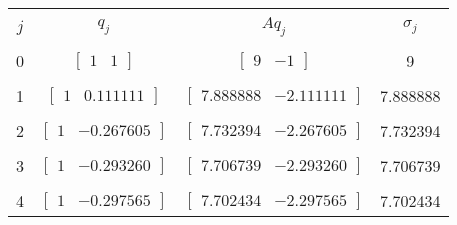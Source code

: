 \documentclass[a4paper,11pt]{article}
\begin{document}
\begin{enumerate}[label=\textbf{(\alph*)}]
            \begin{center}
                \begin{tabular}{ | c | c | c | c | } 
                    \hline
                    & & & \\ [-1em]
                    $j$ & $q_j$ & $Aq_j$ & $\sigma_j$\\  [+.5em]
                    \hline\hline
                    & & & \\ [-1em]
                    0 & $\begin{bmatrix} 1 & 1 \end{bmatrix}$ & $\begin{bmatrix} 9 & -1 \end{bmatrix}$  & 9\\ [+.5em]
                    \hline
                    & & & \\ [-1em]
                    1 & $\begin{bmatrix} 1 & 0.111111 \end{bmatrix}$ & $\begin{bmatrix} 7.888888 & -2.111111 \end{bmatrix}$  & 7.888888\\ [+.5em]
                    \hline
                    & & & \\ [-1em]
                    2 & $\begin{bmatrix} 1 & -0.267605 \end{bmatrix}$ & $\begin{bmatrix} 7.732394 & -2.267605 \end{bmatrix}$  & 7.732394\\ [+.5em]
                    \hline
                    & & & \\ [-1em]
                    3 & $\begin{bmatrix} 1 & -0.293260 \end{bmatrix}$ & $\begin{bmatrix} 7.706739 & -2.293260 \end{bmatrix}$  & 7.706739\\ [+.5em]
                    \hline
                    & & & \\ [-1em]
                    4 & $\begin{bmatrix} 1  & -0.297565 \end{bmatrix}$ & $\begin{bmatrix} 7.702434 & -2.297565 \end{bmatrix}$  & 7.702434 \\ [+.5em]
                    \hline

\end{tabular}
\end{center}
\end{enumerate}
\end{document}
